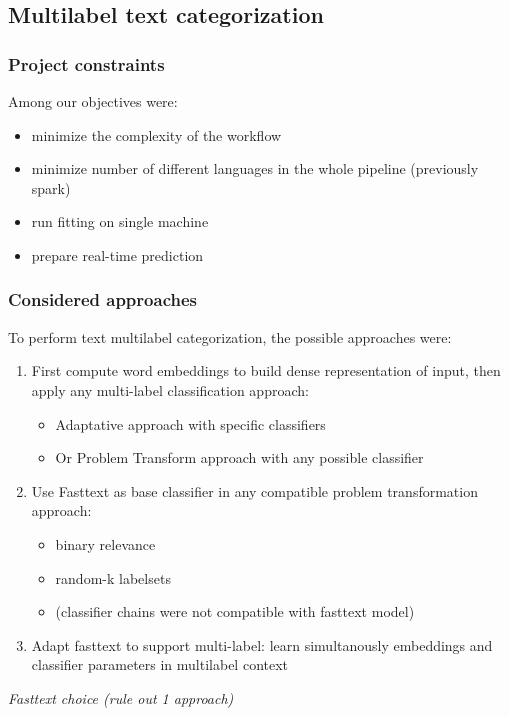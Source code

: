 \subsection{Multilabel text categorization}

\subsubsection{Project constraints}

Among our objectives were:
\begin{itemize}
	\item minimize the complexity of the workflow
	\item minimize number of different languages in the whole pipeline (previously spark)
	\item run fitting on single machine
	\item prepare real-time prediction
\end{itemize}


\subsubsection{Considered approaches}
To perform text multilabel categorization, the possible approaches were:
\begin{enumerate}
	\item First compute word embeddings to build dense representation of input, then apply any multi-label classification approach:
	\begin{itemize}
		\item Adaptative approach with specific classifiers
		\item Or Problem Transform approach with any possible classifier
	\end{itemize}
	\item Use Fasttext as base classifier in any compatible problem transformation approach:
	\begin{itemize}
		\item binary relevance
		\item random-k labelsets
		\item (classifier chains were not compatible with fasttext model)
	\end{itemize}
	\item Adapt fasttext to support multi-label: learn simultanously embeddings and classifier parameters in multilabel context
\end{enumerate}


\textit{Fasttext choice (rule out 1 approach)}

